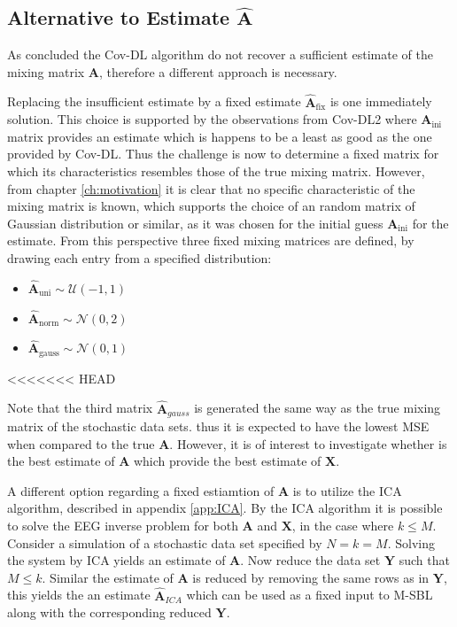 \subsection{Alternative to Estimate $\hat{\textbf{A}}$}  
As concluded the Cov-DL algorithm do not recover a sufficient estimate of the mixing matrix $\mathbf{A}$, therefore a different approach is necessary. 

Replacing the insufficient estimate by a fixed estimate $\hat{\mathbf{A}}_{\text{fix}}$ is one immediately solution. 
This choice is supported by the observations from Cov-DL2 where $\mathbf{A}_{\text{ini}}$ matrix provides an estimate which is happens to be a least as good as the one provided by Cov-DL. 
Thus the challenge is now to determine a fixed matrix for which its characteristics resembles those of the true mixing matrix. 
However, from chapter \ref{ch:motivation} it is clear that no specific characteristic of the mixing matrix is known, which supports the choice of an random matrix of Gaussian distribution or similar, as it was chosen for the initial guess $\mathbf{A}_{\text{ini}}$ for the estimate.   
From this perspective three fixed mixing matrices are defined, by drawing each entry from a specified distribution: 
\begin{itemize}
\item[] $\hat{\mathbf{A}}_{\text{uni}} \sim \mathcal{U}(-1,1)$
\item[] $\hat{\mathbf{A}}_{\text{norm}} \sim \mathcal{N}(0, 2)$ 
\item[] $\hat{\mathbf{A}}_{\text{gauss}} \sim \mathcal{N}(0,1)$                                           
\end{itemize}
<<<<<<< HEAD

Note that the third matrix $\hat{\textbf{A}}_{gauss}$ is generated the same way as the true mixing matrix of the stochastic data sets. thus it is expected to have the lowest MSE when compared to the true $\textbf{A}$. However, it is of interest to investigate whether is the best estimate of $\textbf{A}$ which provide the best estimate of $\textbf{X}$.   

A different option regarding a fixed estiamtion of $\textbf{A}$ is to utilize the ICA algorithm, described in appendix \ref{app:ICA}. By the ICA algorithm it is possible to solve the EEG inverse problem for both $\textbf{A}$ and $\textbf{X}$, in the case where $k \leq M$.
Consider a simulation of a stochastic data set specified by $N = k = M$. Solving the system by ICA yields an estimate of $\textbf{A}$. Now reduce the data set $\textbf{Y}$ such that $M \leq k$. Similar the estimate of $\textbf{A}$ is reduced by removing the same rows as in $\textbf{Y}$, this yields the an estimate $\hat{\textbf{A}}_{ICA}$ which can be used as a fixed input to M-SBL along with the corresponding reduced $\textbf{Y}$.

